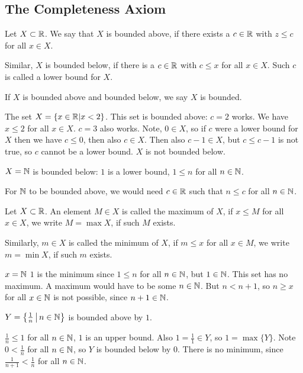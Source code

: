 \documentclass[10pt, a4paper]{article}
\begin{document}
\subsection{The Completeness Axiom}
\begin{definition}
    Let $X \subset \mathbb{R}$. We say that $X$ is bounded above, if there exists a $c \in \mathbb{R}$ with $z \leq c$ for all $x \in X$.
    
    Similar, $X$ is bounded below, if there is a $c \in \mathbb{R}$ with $c \leq x$ for all $x \in X$. Such $c$ is called a lower bound for $X$.
    
    If $X$ is bounded above and bounded below, we say $X$ is bounded.
\end{definition}

\begin{example}
    The set $X = \{x \in \mathbb{R} | x < 2\}$. This set is bounded above: $c = 2$ works. We have $x \leq 2$ for all $x \in X$. $c = 3$ also works. Note, $0 \in X$, so if $c$ were a lower bound for $X$ then we have $c \leq 0$, then also $c \in X$. Then also $c - 1 \in X$, but $c \leq c - 1$ is not true, so $c$ cannot be a lower bound. $X$ is not bounded below.
\end{example}

\begin{example}
    $X = \mathbb{N}$ is bounded below: $1$ is a lower bound, $1 \leq n$ for all $n \in \mathbb{N}$.

    For $\mathbb{N}$ to be bounded above, we would need $c \in \mathbb{R}$ such that $n \leq c$ for all $n \in \mathbb{N}$.
\end{example}

\begin{definition}
    Let $X \subset \mathbb{R}$. An element $M \in X$ is called the maximum of $X$, if $x \leq M$ for all $x \in X$, we write $M = \max X$, if such $M$ exists.

    Similarly, $m \in X$ is called the minimum of $X$, if $m \leq x$ for all $x \in M$, we write $m = \min X$, if such $m$ exists.
\end{definition}

\begin{example}\label{examp:analy:1}
    $x = \mathbb{N}$ $1$ is the minimum since $1 \leq n$ for all $n \in \mathbb{N}$, but $1 \in \mathbb{N}$. This set has no maximum. A maximum would have to be some $n \in \mathbb{N}$. But $n < n + 1$, so $n \geq x$ for all $x \in \mathbb{N}$ is not possible, since $n + 1 \in \mathbb{N}$.
\end{example}

\begin{example}
    $Y = \left\{\frac{1}{n} \,\middle|\, n \in \mathbb{N}\right\}$ is bounded above by $1$.
    
    $\frac{1}{n} \leq1$ for all $n \in \mathbb{N}$, $1$ is an upper bound.
    Also $1 = \frac{1}{1} \in Y$, so $1 = \max\{Y\}$.
    Note $0 < \frac{1}{n}$ for all $n \in \mathbb{N}$, so $Y$ is bounded below by $0$.
    There is no minimum,
    since $\frac{1}{n + 1} < \frac{1}{n}$ for all $n \in \mathbb{N}$.
\end{example}
\end{document}
